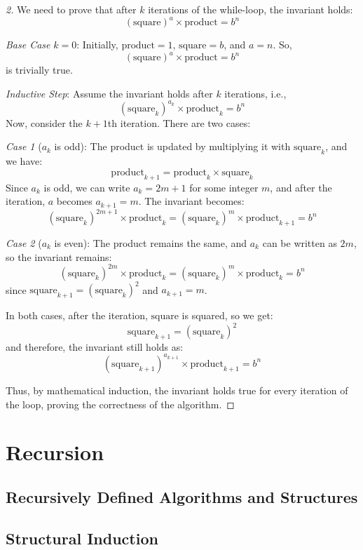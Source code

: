 \begin{proof}[2]
    We need to prove that after \(k\) iterations of the while-loop, the invariant holds:
\[
(\text{square})^a \times \text{product} = b^n
\]

\textit{Base Case} \(k=0\):
Initially, \(\text{product} = 1\), \(\text{square} = b\), and \(a = n\). So,
\[
(\text{square})^a \times \text{product} = b^n
\]
is trivially true.

\textit{Inductive Step}:
Assume the invariant holds after \(k\) iterations, i.e.,
\[
(\text{square}_k)^{a_k} \times \text{product}_k = b^n
\]
Now, consider the \(k+1\)th iteration. There are two cases:

\textit{Case 1} (\(a_k\) is odd):
The product is updated by multiplying it with \(\text{square}_k\), and we have:
\[
\text{product}_{k+1} = \text{product}_k \times \text{square}_k
\]
Since \(a_k\) is odd, we can write \(a_k = 2m + 1\) for some integer \(m\), and after the iteration, \(a\) becomes \(a_{k+1} = m\). The invariant becomes:
\[
(\text{square}_k)^{2m+1} \times \text{product}_k = (\text{square}_k)^m \times \text{product}_{k+1} = b^n
\]

\textit{Case 2} (\(a_k\) is even):
The product remains the same, and \(a_k\) can be written as \(2m\), so the invariant remains:
\[
(\text{square}_k)^{2m} \times \text{product}_k = (\text{square}_k)^m \times \text{product}_k = b^n
\]
since \(\text{square}_{k+1} = (\text{square}_k)^2\) and \(a_{k+1} = m\).

In both cases, after the iteration, \(\text{square}\) is squared, so we get:
\[
\text{square}_{k+1} = (\text{square}_k)^2
\]
and therefore, the invariant still holds as:
\[
(\text{square}_{k+1})^{a_{k+1}} \times \text{product}_{k+1} = b^n
\]

Thus, by mathematical induction, the invariant holds true for every iteration of the loop, proving the correctness of the algorithm.
\end{proof}




\section{Recursion}
\subsection{Recursively Defined Algorithms and Structures}
\subsection{Structural Induction}